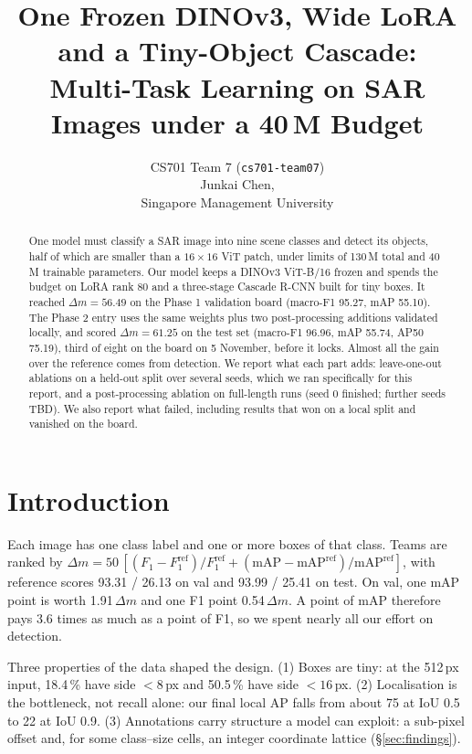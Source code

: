 \documentclass[10pt,twocolumn,letterpaper]{article}
\title{One Frozen DINOv3, Wide LoRA and a Tiny-Object Cascade:\\Multi-Task Learning on SAR Images under a 40\,M Budget}
\author{CS701 Team 7 (\texttt{cs701-team07})\\
Junkai Chen, \TEAMMATES\\
Singapore Management University}
\newcommand{\dm}{\ensuremath{\Delta m}}
\begin{document}
\maketitle

\begin{abstract}
One model must classify a SAR image into nine scene classes and detect its objects, half of which are smaller than a $16{\times}16$ ViT patch, under limits of 130\,M total and 40\,M trainable parameters. Our model keeps a DINOv3 ViT-B/16 frozen and spends the budget on LoRA rank 80 and a three-stage Cascade R-CNN built for tiny boxes. It reached $\dm=56.49$ on the Phase 1 validation board (macro-F1 95.27, mAP 55.10). The Phase 2 entry uses the same weights plus two post-processing additions validated locally, and scored $\dm=61.25$ on the test set (macro-F1 96.96, mAP 55.74, AP50 75.19), third of eight on the board on 5 November, before it locks. Almost all the gain over the reference comes from detection. We report what each part adds: leave-one-out ablations on a held-out split over several seeds, which we ran specifically for this report, and a post-processing ablation on full-length runs (seed 0 finished; further seeds TBD). We also report what failed, including results that won on a local split and vanished on the board.
\end{abstract}

\section{Introduction}
\label{sec:intro}
Each image has one class label and one or more boxes of that class. Teams are ranked by $\dm = 50\,[(F_1-F_1^{\text{ref}})/F_1^{\text{ref}} + (\text{mAP}-\text{mAP}^{\text{ref}})/\text{mAP}^{\text{ref}}]$, with reference scores 93.31 / 26.13 on val and 93.99 / 25.41 on test. On val, one mAP point is worth 1.91\,\dm{} and one F1 point 0.54\,\dm{}. A point of mAP therefore pays 3.6 times as much as a point of F1, so we spent nearly all our effort on detection.

Three properties of the data shaped the design. (1) Boxes are tiny: at the 512\,px input, 18.4\,\% have side ${<}8$\,px and 50.5\,\% have side ${<}16$\,px. (2) Localisation is the bottleneck, not recall alone: our final local AP falls from about 75 at IoU 0.5 to 22 at IoU 0.9. (3) Annotations carry structure a model can exploit: a sub-pixel offset and, for some class--size cells, an integer coordinate lattice (\S\ref{sec:findings}).
\end{document}
